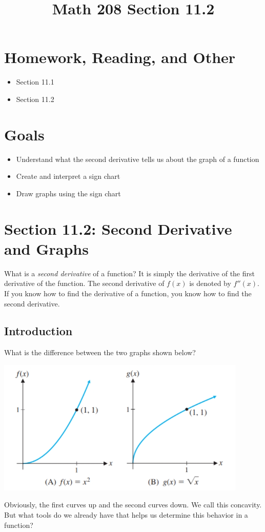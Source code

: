 \documentclass[14pt]{extarticle}
\title{\vspace{-5ex}Math 208 Section 11.2}
\date{\vspace{-10ex}}
\begin{document}
	\maketitle
	
\section{Homework, Reading, and Other}
\begin{itemize}
	\item Section 11.1
	\item Section 11.2
\end{itemize}

\section{Goals}
\begin{itemize}
	\item Understand what the second derivative tells us about the graph of a function
	\item Create and interpret a sign chart
	\item Draw graphs using the sign chart
\end{itemize}


\section{Section 11.2: Second Derivative and Graphs}
What is a \textit{second derivative} of a function? It is simply the derivative of the first derivative of the function. The second derivative of $f(x)$ is denoted by $f''(x)$. If you know how to find the derivative of a function, you know how to find the second derivative.

\subsection{Introduction}
What is the difference between the two graphs shown below?
\begin{center}\includegraphics[width=0.7\linewidth]{11-2-a1}\end{center}
Obviously, the first curves up and the second curves down. We call this concavity. But what tools do we already have that helps us determine this behavior in a function?
\end{document}
